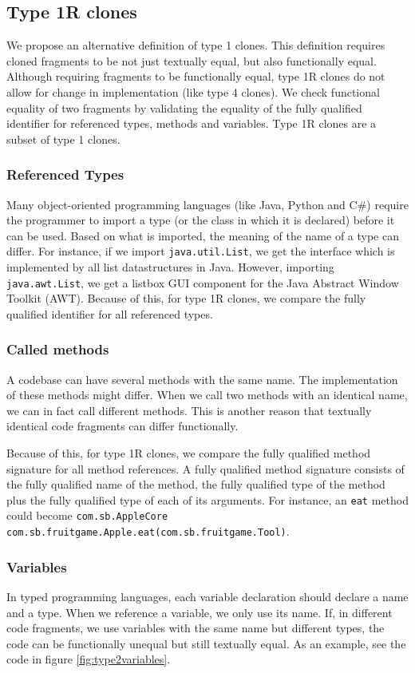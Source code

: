 \subsection{Type 1R clones} \label{chap:type1rclones}
We propose an alternative definition of type 1 clones. This definition requires cloned fragments to be not just textually equal, but also functionally equal. Although requiring fragments to be functionally equal, type 1R clones do not allow for change in implementation (like type 4 clones). We check functional equality of two fragments by validating the equality of the fully qualified identifier for referenced types, methods and variables. Type 1R clones are a subset of type 1 clones.

\subsubsection{Referenced Types}
Many object-oriented programming languages (like Java, Python and C\#) require the programmer to import a type (or the class in which it is declared) before it can be used. Based on what is imported, the meaning of the name of a type can differ. For instance, if we import \texttt{java.util.List}, we get the interface which is implemented by all list datastructures in Java. However, importing \texttt{java.awt.List}, we get a listbox GUI component for the Java Abstract Window Toolkit (AWT). Because of this, for type 1R clones, we compare the fully qualified identifier for all referenced types.

\subsubsection{Called methods}
A codebase can have several methods with the same name. The implementation of these methods might differ. When we call two methods with an identical name, we can in fact call different methods. This is another reason that textually identical code fragments can differ functionally.

Because of this, for type 1R clones, we compare the fully qualified method signature for all method references. A fully qualified method signature consists of the fully qualified name of the method, the fully qualified type of the method plus the fully qualified type of each of its arguments. For instance, an \texttt{eat} method could become \texttt{com.sb.AppleCore com.sb.fruitgame.Apple.eat(com.sb.fruitgame.Tool)}.

\subsubsection{Variables}
In typed programming languages, each variable declaration should declare a name and a type. When we reference a variable, we only use its name. If, in different code fragments, we use variables with the same name but different types, the code can be functionally unequal but still textually equal. As an example, see the code in figure \ref{fig:type2variables}.

